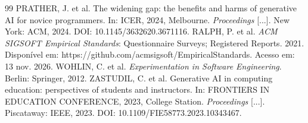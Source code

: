 \documentclass[12pt,a4paper]{article}
\begin{document}
\begin{thebibliography}{99}
 PRATHER, J. et al. The widening gap: the benefits and harms of generative AI for novice programmers. In: ICER, 2024, Melbourne. \emph{Proceedings} [...]. New York: ACM, 2024. DOI: 10.1145/3632620.3671116.
 RALPH, P. et al. \emph{ACM SIGSOFT Empirical Standards}: Questionnaire Surveys; Registered Reports. 2021. Disponível em: https://github.com/acmsigsoft/EmpiricalStandards. Acesso em: 13 nov. 2026.
 WOHLIN, C. et al. \emph{Experimentation in Software Engineering}. Berlin: Springer, 2012.
 ZASTUDIL, C. et al. Generative AI in computing education: perspectives of students and instructors. In: FRONTIERS IN EDUCATION CONFERENCE, 2023, College Station. \emph{Proceedings} [...]. Piscataway: IEEE, 2023. DOI: 10.1109/FIE58773.2023.10343467.
\end{thebibliography}
\endgroup
\end{document}
